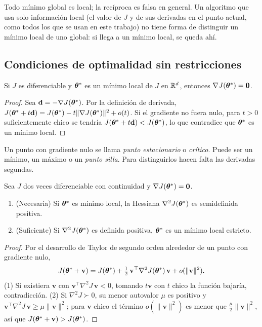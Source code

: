 Todo mínimo global es local; la recíproca es falsa en general. Un algoritmo que usa solo información
local (el valor de $J$ y de sus derivadas en el punto actual, como todos los que se usan en este trabajo)
no tiene forma de distinguir un mínimo local de uno global: si llega a un mínimo local, se queda ahí.

\subsection{Condiciones de optimalidad sin restricciones}

\begin{teorema}
\label{teo:primer_orden}
Si $J$ es diferenciable y $\boldsymbol{\theta}^*$ es un mínimo local de $J$ en $\mathbb{R}^d$, entonces $\nabla J(\boldsymbol{\theta}^*) = \mathbf{0}$.
\end{teorema}
\begin{proof}
Sea $\mathbf{d} = -\nabla J(\boldsymbol{\theta}^*)$. Por la definición de derivada,
$J(\boldsymbol{\theta}^* + t\mathbf{d}) = J(\boldsymbol{\theta}^*) - t\lVert\nabla J(\boldsymbol{\theta}^*)\rVert^2 + o(t)$. Si el gradiente no fuera nulo,
para $t > 0$ suficientemente chico se tendría $J(\boldsymbol{\theta}^* + t\mathbf{d}) < J(\boldsymbol{\theta}^*)$, lo que contradice que
$\boldsymbol{\theta}^*$ es un mínimo local.
\end{proof}

Un punto con gradiente nulo se llama \emph{punto estacionario} o \emph{crítico}. Puede ser un mínimo, un
máximo o un \emph{punto silla}. Para distinguirlos hacen falta las derivadas segundas.

\begin{teorema}
\label{teo:segundo_orden}
Sea $J$ dos veces diferenciable con continuidad y $\nabla J(\boldsymbol{\theta}^*) = \mathbf{0}$.
\begin{enumerate}
  \item (Necesaria) Si $\boldsymbol{\theta}^*$ es mínimo local, la Hessiana $\nabla^2 J(\boldsymbol{\theta}^*)$ es semidefinida positiva.
  \item (Suficiente) Si $\nabla^2 J(\boldsymbol{\theta}^*)$ es definida positiva, $\boldsymbol{\theta}^*$ es un mínimo local estricto.
\end{enumerate}
\end{teorema}
\begin{proof}
Por el desarrollo de Taylor de segundo orden alrededor de un punto con gradiente nulo,
\[
  J(\boldsymbol{\theta}^* + \mathbf{v}) = J(\boldsymbol{\theta}^*) + \tfrac12\, \mathbf{v}^\top \nabla^2 J(\boldsymbol{\theta}^*)\, \mathbf{v} + o(\lVert\mathbf{v}\rVert^2).
\]
(1) Si existiera $\mathbf{v}$ con $\mathbf{v}^\top \nabla^2 J\,\mathbf{v} < 0$, tomando $t\mathbf{v}$ con $t$ chico la
función bajaría, contradicción. (2) Si $\nabla^2 J \succ 0$, su menor autovalor $\mu$ es positivo y
$\mathbf{v}^\top\nabla^2 J\,\mathbf{v} \ge \mu\lVert\mathbf{v}\rVert^2$; para $\mathbf{v}$ chico el término
$o(\lVert\mathbf{v}\rVert^2)$ es menor que $\tfrac{\mu}{2}\lVert\mathbf{v}\rVert^2$, así que
$J(\boldsymbol{\theta}^* + \mathbf{v}) > J(\boldsymbol{\theta}^*)$.
\end{proof}

